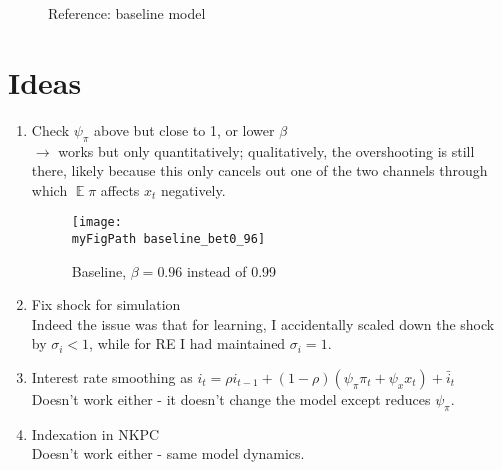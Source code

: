 \documentclass[11pt]{article}
\def \myFigPath {../figures/}
\renewcommand{\[}{\begin{equation}}
\renewcommand{\]}{\end{equation}}
\DeclareMathOperator{\E}{\mathbb{E}}
\def\mySmallerFigScale{0.18}
\def\myAdjustableFigScale{0.14}
\begin{document}
\newpage
\begin{figure}[h!]
\caption{Reference: baseline model}
\end{figure}


\section{Ideas}
\begin{enumerate}
\item Check $\psi_{\pi}$ above but close to 1, or lower $\beta$ \\
$\rightarrow$ works but only quantitatively; qualitatively, the overshooting is still there, likely because this only cancels out one of the two channels through which $\E{\pi}$ affects $x_t$ negatively.
\begin{figure}[h!]
\texttt{[image: \\myFigPath baseline\_bet0\_96]}
\caption{Baseline, $\beta = 0.96$ instead of 0.99}
\label{pill}
\end{figure}

\item Fix shock for simulation \\
Indeed the issue was that for learning, I accidentally scaled down the shock by $\sigma_i < 1$, while for RE I had maintained $\sigma_i = 1$.
\item Interest rate smoothing as  $i_t = \rho i_{t-1} + (1-\rho)(\psi_{\pi}\pi_t + \psi_x x_t) + \bar{i}_t$ \\
Doesn't work either - it doesn't change the model except reduces $\psi_{\pi}$.
\item Indexation in NKPC \\
Doesn't work either - same model dynamics.


\end{enumerate}
\end{document}
